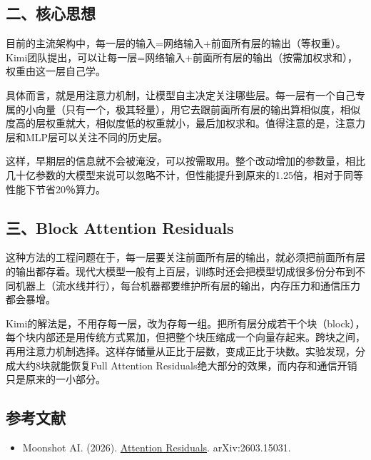\hypertarget{ux4e8cux6838ux5fc3ux601dux60f3-1}{%
\subsection{二、核心思想}\label{ux4e8cux6838ux5fc3ux601dux60f3-1}}

目前的主流架构中，每一层的输入=网络输入+前面所有层的输出（等权重）。Kimi团队提出，可以让每一层=网络输入+前面所有层的输出（按需加权求和），权重由这一层自己学。

具体而言，就是用注意力机制，让模型自主决定关注哪些层。每一层有一个自己专属的小向量（只有一个，极其轻量），用它去跟前面所有层的输出算相似度，相似度高的层权重就大，相似度低的权重就小，最后加权求和。值得注意的是，注意力层和MLP层可以关注不同的历史层。

这样，早期层的信息就不会被淹没，可以按需取用。整个改动增加的参数量，相比几十亿参数的大模型来说可以忽略不计，但性能提升到原来的1.25倍，相对于同等性能下节省20％算力。

\hypertarget{ux4e09block-attention-residuals}{%
\subsection{三、Block Attention Residuals}\label{ux4e09block-attention-residuals}}

这种方法的工程问题在于，每一层要关注前面所有层的输出，就必须把前面所有层的输出都存着。现代大模型一般有上百层，训练时还会把模型切成很多份分布到不同机器上（流水线并行），每台机器都要维护所有层的输出，内存压力和通信压力都会暴增。

Kimi的解法是，不用存每一层，改为存每一组。把所有层分成若干个块（block），每个块内部还是用传统方式累加，但把整个块压缩成一个向量存起来。跨块之间，再用注意力机制选择。这样存储量从正比于层数，变成正比于块数。实验发现，分成大约8块就能恢复Full Attention Residuals绝大部分的效果，而内存和通信开销只是原来的一小部分。

\hypertarget{ux53c2ux8003ux6587ux732e-102}{%
\subsection{参考文献}\label{ux53c2ux8003ux6587ux732e-102}}

\begin{itemize}
\tightlist
\item
  Moonshot AI. (2026). \href{https://arxiv.org/abs/2603.15031}{Attention Residuals}. arXiv:2603.15031.
\end{itemize}

\clearpage

